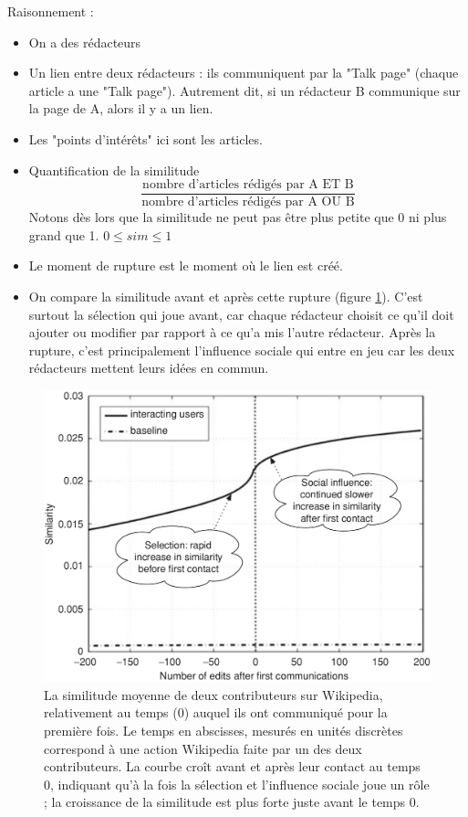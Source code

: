 Raisonnement :
\begin{itemize}
\item On a des rédacteurs
\item Un lien entre deux rédacteurs : ils communiquent par la "Talk page" (chaque article a une "Talk page"). Autrement dit, si un rédacteur B communique sur la page de A, alors il y a un lien.
\item Les "points d'intérêts" ici sont les articles.
\item Quantification de la similitude
	$$\displaystyle\frac{\mbox{nombre d'articles rédigés par A ET B}}{\mbox{nombre d'articles rédigés par A OU B}}$$
Notons dès lors que la similitude ne peut pas être plus petite que 0 ni plus grand que 1. $0 \leq sim \leq 1$
\item Le moment de rupture est le moment où le lien est créé.
\item On compare la similitude avant et après cette rupture (figure
    \ref{wikipedia}). C'est surtout la sélection qui joue avant, car chaque rédacteur choisit ce qu'il doit ajouter ou modifier par rapport à ce qu'a mis l'autre rédacteur. Après la rupture, c'est principalement l'influence sociale qui entre en jeu car les deux rédacteurs mettent leurs idées en commun.
\end{itemize}

\begin{figure}[!ht]
    \includegraphics[width=\textwidth]{images/21_wikipedia.png}
    \caption{La similitude moyenne de deux contributeurs sur Wikipedia,
        relativement au temps (0) auquel ils ont communiqué pour la
        première fois. Le temps en abscisses, mesurés en unités
        discrètes correspond à une action Wikipedia faite par un des
        deux contributeurs. La courbe croît avant et après leur contact
        au temps 0, indiquant qu'à la fois la sélection et l'influence
        sociale joue un rôle ; la croissance de la similitude est plus
    forte juste avant le temps 0.}
    \label{wikipedia}
\end{figure}
